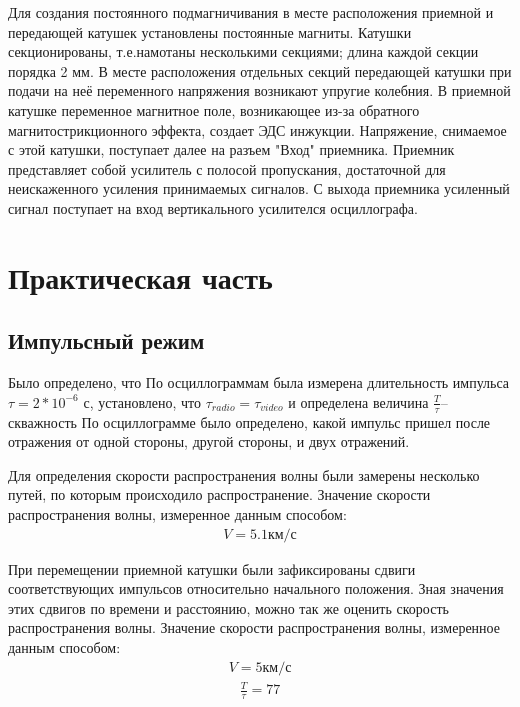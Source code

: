 Для создания постоянного подмагничивания в месте расположения приемной и передающей катушек установлены постоянные магниты. Катушки секционированы, т.е.намотаны несколькими секциями; длина каждой секции порядка 2 мм. В месте расположения отдельных секций передающей катушки при подачи на неё переменного напряжения возникают упругие колебния. В приемной катушке переменное магнитное поле, возникающее из-за обратного магнитострикционного эффекта, создает ЭДС инжукции. Напряжение, снимаемое с этой катушки, поступает далее на разъем "Вход" приемника. Приемник представляет собой усилитель с полосой пропускания, достаточной для неискаженного усиления принимаемых сигналов. С выхода приемника усиленный сигнал поступает на вход вертикального усилителся осциллографа.

\section{Практическая часть}
\subsection{Импульсный режим}
Было определено, что 
По осциллограммам была измерена длительность импульса $\tau=2*10^{-6}$ с, установлено, что $\tau_{radio}=\tau_{video}$  и определена величина $\frac{T}{\tau}$-- скважность
По осциллограмме было определено, какой импульс пришел после отражения от одной стороны, другой стороны, и двух отражений.

Для определения скорости распространения волны были замерены несколько путей, по которым происходило распространение.
Значение скорости распространения волны, измеренное данным способом:
\begin{gather*}
	V=5.1\text{км/с}
\end{gather*}


При перемещении приемной катушки были зафиксированы сдвиги соответствующих импульсов относительно начального положения. Зная значения этих сдвигов по времени и расстоянию, можно так же оценить скорость распространения волны.
Значение скорости распространения волны, измеренное данным способом:
\begin{gather*}
	V=5\text{км/с}
\end{gather*}
\begin{gather*}
	\frac{T}{\tau}=77
\end{gather*}


